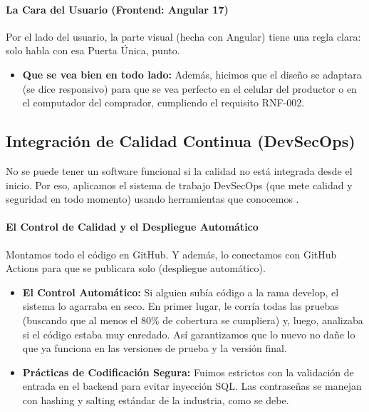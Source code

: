 \paragraph{La Cara del Usuario (Frontend: Angular 17)}

Por el lado del usuario, la parte visual (hecha con Angular) tiene una regla clara: solo habla con esa Puerta Única, punto.

\begin{itemize}
\item \textbf{Que se vea bien en todo lado:} Además, hicimos que el diseño se adaptara (se dice responsivo) para que se vea perfecto en el celular del productor o en el computador del comprador, cumpliendo el requisito RNF-002.
\end{itemize}

\subsection{Integración de Calidad Continua (DevSecOps)}

No se puede tener un software funcional si la calidad no está integrada desde el inicio. Por eso, aplicamos el sistema de trabajo DevSecOps (que mete calidad y seguridad en todo momento) usando herramientas que conocemos \cite{ia2025}.

\paragraph{El Control de Calidad y el Despliegue Automático}

Montamos todo el código en GitHub. Y además, lo conectamos con GitHub Actions para que se publicara solo (despliegue automático).

\begin{itemize}
\item \textbf{El Control Automático:} Si alguien subía código a la rama develop, el sistema lo agarraba en seco. En primer lugar, le corría todas las pruebas (buscando que al menos el 80\% de cobertura se cumpliera) y, luego, analizaba si el código estaba muy enredado. Así garantizamos que lo nuevo no dañe lo que ya funciona en las versiones de prueba y la versión final.

\item \textbf{Prácticas de Codificación Segura:} Fuimos estrictos con la validación de entrada en el backend para evitar inyección SQL. Las contraseñas se manejan con hashing y salting estándar de la industria, como se debe.
\end{itemize}

